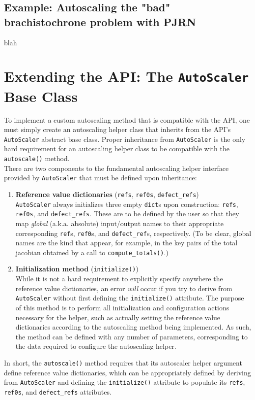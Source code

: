 \documentclass{article}
\theoremstyle{definition}
\begin{document}
\subsection*{Example: Autoscaling the "bad" brachistochrone problem with PJRN}
blah

\section{Extending the API: The \texttt{AutoScaler} Base Class}
To implement a custom autoscaling method that is compatible with the API, one must simply create an autoscaling helper class that inherits from the API's \texttt{AutoScaler} abstract base class. Proper inheritance from \texttt{AutoScaler} is the only hard requirement for an autoscaling helper class to be compatible with the \texttt{autoscale()} method. \\

\noindent
There are two components to the fundamental autoscaling helper interface provided by \texttt{AutoScaler} that must be defined upon inheritance:
\begin{enumerate}
    \item \textbf{Reference value dictionaries} (\texttt{refs}, \texttt{ref0s}, \texttt{defect\_refs}) \\
    \texttt{AutoScaler} always initializes three empty \texttt{dict}s upon construction: \texttt{refs}, \texttt{ref0s}, and \texttt{defect\_refs}. These are to be defined by the user so that they map \textit{global} (a.k.a. absolute) input/output names to their appropriate corresponding \texttt{ref}s, \texttt{ref0}s, and \texttt{defect\_ref}s, respectively. (To be clear, global names are the kind that appear, for example, in the key pairs of the total jacobian obtained by a call to \verb|compute_totals()|.) 
    \item \textbf{Initialization method} (\texttt{initialize()}) \\
    While it is not a hard requirement to explicitly specify anywhere the reference value dictionaries, an error \textit{will} occur if you try to derive from \texttt{AutoScaler} without first defining the \texttt{initialize()} attribute. The purpose of this method is to perform all initialization and configuration actions necessary for the helper, such as actually setting the reference value dictionaries according to the autoscaling method being implemented. As such, the method can be defined with any number of parameters, corresponding to the data required to configure the autoscaling helper.
\end{enumerate}
In short, the \texttt{autoscale()} method requires that its autoscaler helper argument define reference value dictionaries, which can be appropriately defined by deriving from \texttt{AutoScaler} and defining the \texttt{initialize()} attribute to populate its \texttt{refs}, \texttt{ref0s}, and \texttt{defect\_refs} attributes.
\end{document}
